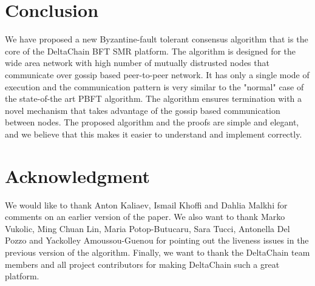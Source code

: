 \section{Conclusion} \label{sec:conclusion}

We have proposed a new Byzantine-fault tolerant consensus algorithm that is the
core of the DeltaChain BFT SMR platform. The algorithm is designed for the wide
area network with high number of mutually distrusted nodes that communicate
over gossip based peer-to-peer network. It has only a single mode of execution
and the communication pattern is very similar to the "normal" case of the
state-of-the art PBFT algorithm. The algorithm ensures termination with a novel
mechanism that takes advantage of the gossip based communication between nodes.
The proposed algorithm and the proofs are simple and elegant, and we believe
that this makes it easier to understand and implement correctly.   

\section*{Acknowledgment}

We would like to thank Anton Kaliaev, Ismail Khoffi and Dahlia Malkhi for comments on an earlier version of the paper. We also want to thank Marko Vukolic, Ming Chuan Lin, Maria Potop-Butucaru, Sara Tucci, Antonella Del Pozzo and Yackolley Amoussou-Guenou for pointing out the liveness issues
in the previous version of the algorithm. Finally, we want to thank the DeltaChain team members and all project contributors for making DeltaChain such a great platform.  
